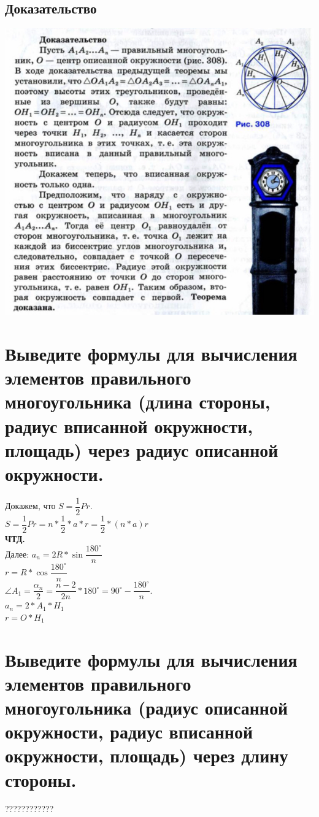 \documentclass[12pt, letterpaper]{article}
\begin{document}
\subsection{Доказательство}
\includegraphics[scale=0.3]{photo5.jpg}

\section {Выведите формулы для вычисления элементов правильного многоугольника (длина стороны, радиус вписанной окружности,  площадь) через радиус описанной окружности.}
Докажем, что $S=\dfrac{1}{2}Pr$. \\
$S=\dfrac{1}{2}Pr=n*\dfrac{1}{2}*a*r=\dfrac{1}{2}*(n*a)r$ \\ 
\textbf{ЧТД.} \\
Далее:
$ a_n=2R*\sin \dfrac{180^{\circ}}{n} $ \\
$ r=R*\cos \dfrac{180^{\circ}}{n}$ \\
$ \angle A_1 = \dfrac{\alpha_n}{2}=\dfrac{n-2}{2n}*180^{\circ}=90^{\circ}-\dfrac{180^{\circ}}{n}. $ \\
$ a_n=2*A_1*H_1 $ \\
$ r=O*H_1 $ \\

\section {Выведите формулы для вычисления элементов правильного многоугольника (радиус описанной окружности, радиус вписанной окружности, площадь) через длину стороны.}
????????????
\end{document}
